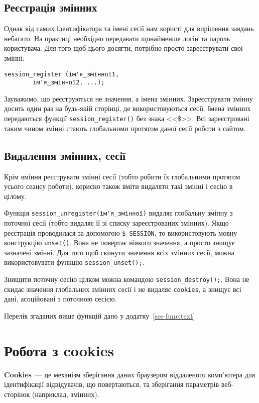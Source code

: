 \subsection*{Реєстрація змінних}
Однак від самих ідентифікатора та імені сесії нам користі для вирішення завдань небагато. На практиці необхідно передавати щонайменше логін та пароль користувача. Для того щоб цього досягти, потрібно просто зареєструвати свої змінні:
\begin{verbatim}
session_register (ім'я_змінної1, 
        ім'я_змінної2, ...); 
\end{verbatim}
Зауважимо, що реєструються не значення, а імена змінних. Зареєструвати змінну досить один раз на будь-якій сторінці, де використовуються сесії. Імена змінних передаються функції \verb'session_register()' без знака <<\$>>. Всі зареєстровані таким чином змінні стають глобальними протягом даної сесії роботи з сайтом. 



\subsection*{Видалення змінних, сесії}
Крім вміння реєструвати змінні сесії (тобто робити їх глобальними протягом усього сеансу роботи), корисно також вміти видаляти такі змінні і сесію в цілому.

Функція \verb|session_unregister(ім'я_змінної)| видаляє глобальну змінну з поточної сесії (тобто видаляє її зі списку зареєстрованих змінних). Якщо реєстрація проводилася за допомогою \verb'$_SESSION', то використовують мовну конструкцію \verb'unset()'. Вона не повертає ніякого значення, а просто знищує зазначені змінні. Для того щоб скинути значення всіх змінних сесії, можна використовувати функцію \verb'session_unset();'.

Знищити поточну сесію цілком можна командою \verb'session_destroy();'. Вона не скидає значення глобальних змінних сесії і не видаляє \verb'cookies', а знищує всі дані, асоційовані з поточною сесією.

Перелік згаданих вище функцій дано у додатку~\ref{ses-func:text}. 
\section{Робота з cookies}

\textbf{Cookies}~--- це механізм зберігання даних браузером віддаленого комп'ютера для ідентифікації відвідувачів, що повертаються, та зберігання параметрів веб-сторінок (наприклад, змінних).

